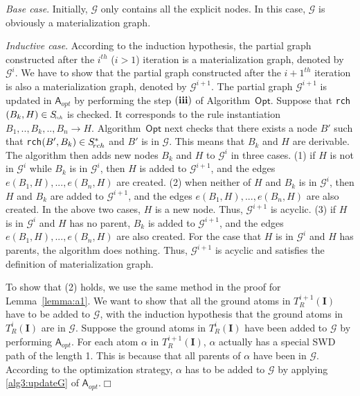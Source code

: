 \emph{Base case}. Initially, $\mathcal{G}$ only contains all the explicit nodes.
In this case, $\mathcal{G}$ is obviously a materialization graph.

\emph{Inductive case}.
According to the induction hypothesis, the partial graph constructed after
the $i^{th}$ ($i>1$) iteration is a materialization graph, denoted by $\mathcal{G}^{i}$.
We have to show that the partial graph constructed after the $i+1^{th}$ iteration is
also a materialization graph, denoted by $\mathcal{G}^{i+1}$.
The partial graph $\mathcal{G}^{i+1}$ is updated in $\mathsf{A}_{opt}$ by performing the step $(\textbf{\romannumeral3})$
of Algorithm~$\mathsf{Opt}$.
Suppose that \texttt{rch}$(B_k,H)\in S_{\textit{\!\tiny rch}}$ is checked.
It corresponds to the rule instantiation $B_1,..,B_k,..,B_n\rightarrow H$.
Algorithm~$\mathsf{Opt}$ next checks that there exists a node $B'$ such that
\texttt{rch}$(B',B_k)\in S^*_{\!\tiny rch}$
and $B'$ is in $\mathcal{G}$. This means that $B_k$ and $H$ are derivable.
The algorithm then adds new nodes $B_k$ and $H$ to $\mathcal{G}^{i}$ in three cases.
(1) if $H$ is not in $\mathcal{G}^{i}$ while $B_k$ is in $\mathcal{G}^{i}$,
then $H$ is added to $\mathcal{G}^{i+1}$, and the edges $e(B_1, H),...,e(B_n, H)$ are created.
(2) when neither of $H$ and $B_k$ is in $\mathcal{G}^{i}$,
then $H$ and $B_k$ are added to $\mathcal{G}^{i+1}$, and the edges $e(B_1, H),...,e(B_n, H)$ are also created.
In the above two cases, $H$ is a new node. Thus,
$\mathcal{G}^{i+1}$ is acyclic.
(3) if $H$ is in $\mathcal{G}^{i}$ and $H$ has no parent,
$B_k$ is added to $\mathcal{G}^{i+1}$, and the edges $e(B_1, H),...,e(B_n, H)$ are also created.
For the case that $H$ is in $\mathcal{G}^{i}$ and $H$ has parents,
the algorithm does nothing.
Thus, $\mathcal{G}^{i+1}$ is acyclic and satisfies the definition of materialization graph.

To show that (2) holds, we use the same method in the proof for Lemma~\ref{lemma:a1}.
We want to show that all the ground atoms in $T_R^{i+1}(\textbf{I})$ have to be added to $\mathcal{G}$,
with the induction hypothesis that the ground atoms in $T_R^{i}(\textbf{I})$ are in $\mathcal{G}$.
Suppose the ground atoms in $T_R^{i}(\textbf{I})$ have been added to $\mathcal{G}$ by
performing $\mathsf{A}_{opt}$.
For each atom $\alpha$ in $T_R^{i+1}(\textbf{I})$, $\alpha$ actually has a special SWD path
of the length 1. This is because that all parents of $\alpha$ have been in $\mathcal{G}$.
According to the optimization strategy, $\alpha$ has to be added to $\mathcal{G}$ by applying \ref{alg3:updateG}
of $\mathsf{A}_{opt}$.\hfill$\Box$


